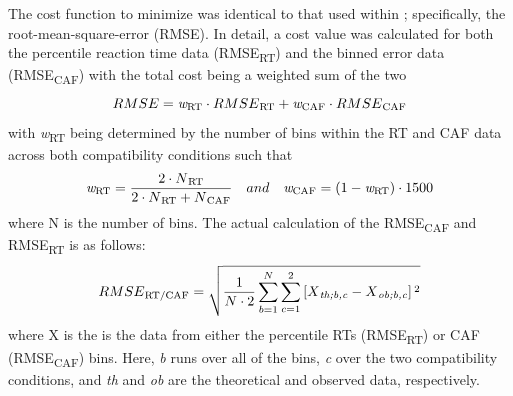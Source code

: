 The cost function to minimize was identical to that used within
\textcite{ulrich2015automatic}; specifically, the root-mean-square-error
(RMSE). In detail, a cost value was calculated for both the percentile reaction time data
(RMSE\textsubscript{RT}) and the binned error data (RMSE\textsubscript{CAF}) with the
total cost being a weighted sum of the two
\begin{equation*}
    RMSE = \textit{w}\textsubscript{RT} \cdot RMSE\textsubscript{RT} + \textit{w}\textsubscript{CAF} \cdot RMSE\textsubscript{CAF}  
\end{equation*}
with \textit{w}\textsubscript{RT} being determined by the number of bins 
within the RT and CAF data across both compatibility conditions such that 
\begin{equation*}
    \textit{w}\textsubscript{RT} = \frac{2 \cdot N\textsubscript{RT}} {2 \cdot N\textsubscript{RT} + N\textsubscript{CAF}} \quad and \quad  \textit{w}\textsubscript{CAF} = (1 - \textit{w}\textsubscript{RT}) \cdot 1500
\end{equation*}
where N is the number of bins. The actual calculation of the RMSE\textsubscript{CAF} and
RMSE\textsubscript{RT} is as follows:
\begin{equation*}
    RMSE\textsubscript{RT/CAF} = \sqrt{\frac{1}{N\cdot2} \sum_{b=1}^{N} \sum_{c=1}^{2} \left[X\textsubscript{\textit{th;b,c}} - X\textsubscript{\textit{ob;b,c}} \right] \textsuperscript{2}} 
\end{equation*}
where X is the is the data from either the percentile RTs
(RMSE\textsubscript{RT}) or CAF (RMSE\textsubscript{CAF}) bins. Here,
\textit{b} runs over all of the bins, \textit{c} over the two compatibility
conditions, and \textit{th} and \textit{ob} are the theoretical and observed
data, respectively. 

